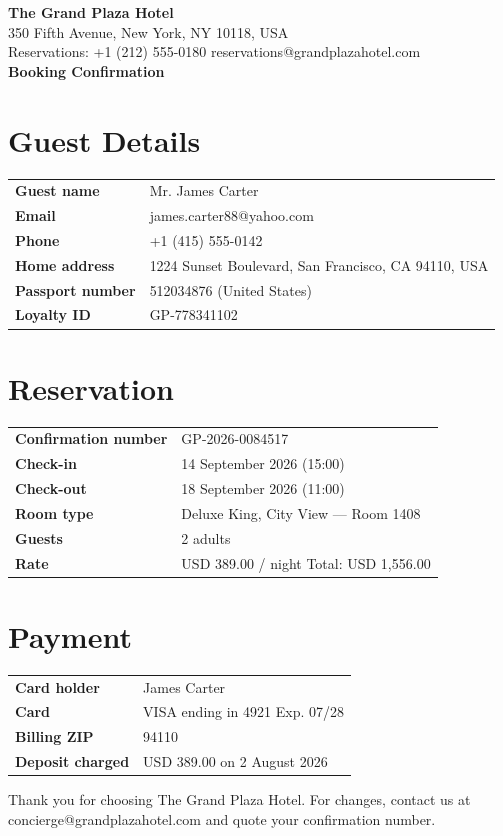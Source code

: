 \documentclass[11pt,a4paper]{article}
\begin{document}
{\Huge\bfseries\color{accent} The Grand Plaza Hotel}\\[0.2em]
{\large 350 Fifth Avenue, New York, NY 10118, USA}\\
Reservations: +1 (212) 555-0180 \quad reservations@grandplazahotel.com\\[0.8em]
{\LARGE\bfseries Booking Confirmation}

\section{Guest Details}
\begin{tabularx}{\linewidth}{@{}>{\bfseries}l X@{}}
Guest name & Mr. James Carter \\
Email & james.carter88@yahoo.com \\
Phone & +1 (415) 555-0142 \\
Home address & 1224 Sunset Boulevard, San Francisco, CA 94110, USA \\
Passport number & 512034876 (United States) \\
Loyalty ID & GP-778341102 \\
\end{tabularx}

\section{Reservation}
\begin{tabularx}{\linewidth}{@{}>{\bfseries}l X@{}}
Confirmation number & GP-2026-0084517 \\
Check-in & 14 September 2026 (15:00) \\
Check-out & 18 September 2026 (11:00) \\
Room type & Deluxe King, City View — Room 1408 \\
Guests & 2 adults \\
Rate & USD 389.00 / night \quad Total: USD 1,556.00 \\
\end{tabularx}

\section{Payment}
\begin{tabularx}{\linewidth}{@{}>{\bfseries}l X@{}}
Card holder & James Carter \\
Card & VISA ending in 4921 \quad Exp. 07/28 \\
Billing ZIP & 94110 \\
Deposit charged & USD 389.00 on 2 August 2026 \\
\end{tabularx}

\vspace{1em}
Thank you for choosing The Grand Plaza Hotel. For changes, contact us at
concierge@grandplazahotel.com and quote your confirmation number.
\end{document}
